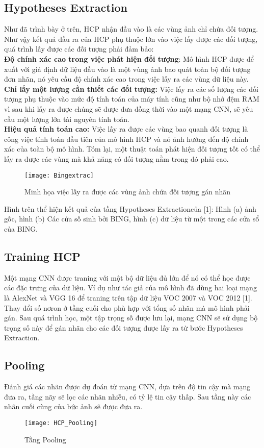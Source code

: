 \documentclass[13pt, a4paper]{extreport}
\begin{document}
\subsection{Hypotheses Extraction}
\indent Như đã trình bày ở trên, HCP nhận đầu vào là các vùng ảnh chỉ chứa đối tượng. Như vậy kết quả đầu ra của HCP phụ thuộc lớn vào việc lấy được các đối tượng, quá trình lấy được các đối tượng phải đảm bảo:\\
\indent \textbf{Độ chính xác cao trong việc phát hiện đối tượng}: Mô hình HCP được để xuất với giả định dữ liệu đầu vào là một vùng ảnh bao quát toàn bộ đối tượng đơn nhãn, nó yêu cầu độ chính xác cao trong việc lấy ra các vùng dữ liệu này.\\
\indent \textbf{Chỉ lấy một lượng cần thiết các đối tượng:} Việc lấy ra các số lượng các đối tượng phụ thuộc vào mức độ tính toán của máy tính cũng như bộ nhớ đệm RAM vì sau khi lấy ra được chúng sẽ được đưa đồng thời vào một mạng CNN, sẽ yêu cầu một lượng lớn tài nguyên tính toán.\\
\indent \textbf{Hiệu quả tính toán cao:} Việc lấy ra được các vùng bao quanh đối tượng là công việc tính toán đầu tiên của mô hình HCP và nó ảnh hưởng đến độ chính xác của toàn bộ mô hình. Tóm lại, một thuật toán phát hiện đối tượng tốt có thể lấy ra được các vùng mà khả năng có đối tượng nằm trong đó phải cao.
\begin{figure}[H]
  \centering
  \captionsetup{justification=centering,margin=2cm}
    \texttt{[image: Bingextrac]}
   \caption{\large Minh họa việc lấy ra được các vùng ảnh chứa đối tượng gán nhãn}
\end{figure}
\indent Hình trên thể hiện kết quả của tầng Hypotheses Extractioncủa [1]: Hình (a) ảnh gốc, hình (b) Các cửa số sinh bởi BING, hình (c) dữ liệu từ một trong các cửa sổ của BING.
\subsection{Training HCP}
\indent Một mạng CNN được traning với một bộ dữ liệu đủ lớn để nó có thể học được các đặc trưng của dữ liệu. Ví dụ như tác giả của mô hình đã dùng hai loại mạng là AlexNet và VGG 16 để traning trên tập dữ liệu VOC 2007 và VOC 2012 [1]. Thay đổi số nơron ở tầng cuối cho phù hợp với tổng số nhãn mà mô hình phải gán. Sau quá trình học, một tập trọng số được lưu lại, mạng CNN sẽ sử dụng bộ trọng số này để gán nhãn cho các đối tượng được lấy ra từ bước Hypotheses Extraction.
\subsection{Pooling}
\indent Đánh giá các nhãn được dự đoán từ mạng CNN, dựa trên độ tin cậy mà mạng đưa ra, tầng nãy sẽ lọc các nhãn nhiễu, có tỷ lệ tin cậy thấp. Sau tầng này các nhãn cuối cùng của bức ảnh sẽ được đưa ra.
\begin{figure}[H]
  \centering
  \captionsetup{justification=centering,margin=2cm}
    \texttt{[image: HCP\_Pooling]}
   \caption{\large Tầng Pooling}
\end{figure}
\newpage
\end{document}
